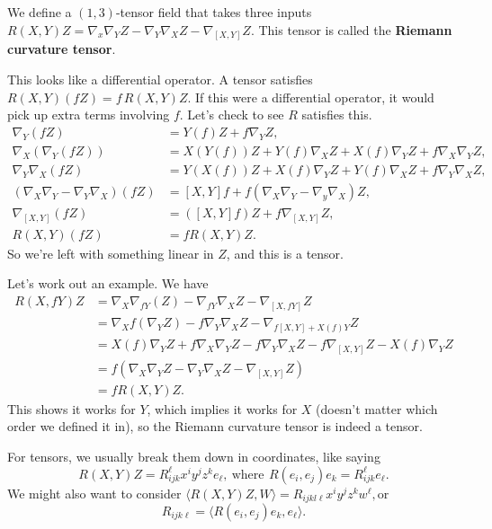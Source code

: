 \begin{definition}[]
    We define a $(1,3)$-tensor field that takes three inputs $R(X,Y)Z=\nabla_x\nabla_Y Z-\nabla _Y\nabla_XZ-\nabla _{[X,Y]}Z$. This tensor is called the \textbf{Riemann curvature tensor}.
\end{definition}
This looks like a differential operator. A tensor satisfies $R(X,Y)(fZ)=f\, R(X,Y)Z$. If this were a differential operator, it would pick up extra terms involving $f$. Let's check to see $R$ satisfies this.
\begin{align*}
    \nabla_Y(fZ)&=Y(f)Z+f\nabla_YZ,\\
    \nabla_X(\nabla_Y(fZ))&=X(Y(f))Z+Y(f)\nabla_XZ+X(f)\nabla_YZ+f\nabla_X\nabla_Y Z,\\
    \nabla_Y\nabla_X(fZ)&=Y(X(f))Z+X(f)\nabla_YZ+Y(f)\nabla_XZ+f\nabla_Y\nabla_XZ,\\
    (\nabla_X\nabla_Y-\nabla_Y\nabla_X)(fZ)&=[X,Y]f+f(\nabla_X\nabla_Y-\nabla_y\nabla_X)Z,\\
\nabla_{[X,Y]}(fZ)&=\left( [X,Y]f \right) Z+f\nabla_{[X,Y]}Z,\\
R(X,Y)(fZ)&=f R(X,Y)Z.
\end{align*}So we're left with something linear in $Z$, and this is a tensor.
\begin{example}
    Let's work out an example. We have
    \begin{align*}
        R(X,fY)Z&=\nabla_X\nabla_{fY}(Z)-\nabla_{fY}\nabla_XZ-\nabla_{[X,fY]}Z\\
                &=\nabla_Xf(\nabla_YZ)-f\nabla_Y\nabla_XZ-\nabla_{f[X,Y]+X(f)Y}Z\\
                &=X(f)\nabla_YZ+f\nabla_X\nabla_YZ-f\nabla_Y\nabla_XZ-f\nabla_{[X,Y]}Z-X(f)\nabla_YZ\\
                &=f(\nabla_X\nabla_YZ-\nabla_Y\nabla_XZ-\nabla_{[X,Y]}Z)\\
                &=fR(X,Y)Z.
    \end{align*}This shows it works for $Y$, which implies it works for $X$ (doesn't matter which order we defined it in), so the Riemann curvature tensor is indeed a tensor.
\end{example}
For tensors, we usually break them down in coordinates, like saying 
\[
R(X,Y)Z=R_{ijk}^{\ell}x^i y^j z^k e_{\ell}, \ \text{where}\, \ R(e_i ,e_j )e_k=R_{ijk}^{\ell}e_{\ell}.
\] 
We might also want to consider $\langle R(X,Y)Z,W \rangle =R_{ijkl\ell}x^i y^j z^kw^{\ell},$or 
\[
R_{ijk\ell}=\langle R(e_i ,e_j )e_k,e_{\ell} \rangle .
\] 

